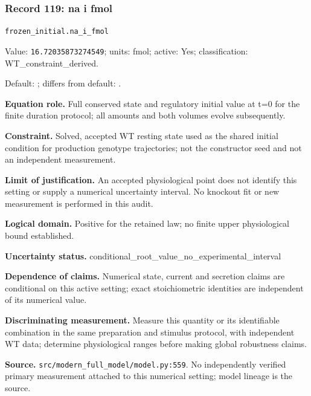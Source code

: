 \subsubsection*{Record 119: na i fmol}
{\small \nolinkurl{frozen_initial.na_i_fmol}\par

Value: \texttt{16.72035873274549}; units: fmol; active: Yes; classification: WT\_constraint\_derived.\par

Default: ; differs from default: .\par

\textbf{Equation role.} Full conserved state and regulatory initial value at t=0 for the finite duration protocol; all amounts and both volumes evolve subsequently.\par

\textbf{Constraint.} Solved, accepted WT resting state used as the shared initial condition for production genotype trajectories; not the constructor seed and not an independent measurement.\par

\textbf{Limit of justification.} An accepted physiological point does not identify this setting or supply a numerical uncertainty interval. No knockout fit or new measurement is performed in this audit.\par

\textbf{Logical domain.} Positive for the retained law; no finite upper physiological bound established.\par

\textbf{Uncertainty status.} conditional\_root\_value\_no\_experimental\_interval\par

\textbf{Dependence of claims.} Numerical state, current and secretion claims are conditional on this active setting; exact stoichiometric identities are independent of its numerical value.\par

\textbf{Discriminating measurement.} Measure this quantity or its identifiable combination in the same preparation and stimulus protocol, with independent WT data; determine physiological ranges before making global robustness claims.\par

\textbf{Source.} \nolinkurl{src/modern_full_model/model.py:559}. No independently verified primary measurement attached to this numerical setting; model lineage is the source.\par}

